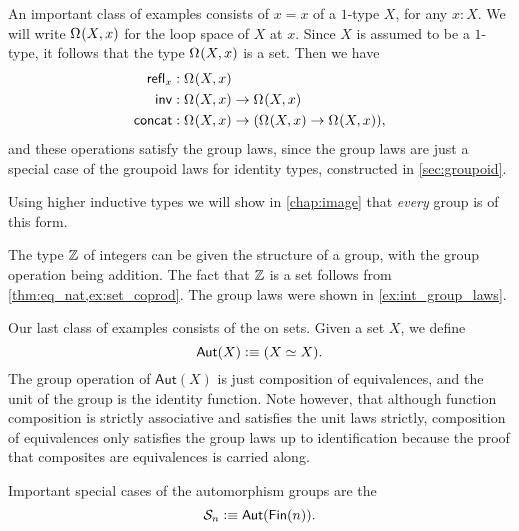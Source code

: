 \begin{eg}
  An important class of examples consists of  $x=x$ of a $1$-type $X$, for any $x:X$. 
  We will write $\Omega^{}(X,x)$ for the loop space of $X$ at $x$. 
  Since $X$ is assumed to be a $1$-type, it follows that the type $\Omega^{}(X,x)$ is a set. Then we have
  \begin{align*}
    \mathsf{refl}_{x} & : \Omega^{}(X,x) \\
    \mathsf{inv} & : \Omega^{}(X,x) \to \Omega^{}(X,x) \\
    \mathsf{concat} & : \Omega^{}(X,x) \to (\Omega^{}(X,x)\to \Omega^{}(X,x)),
  \end{align*}
  and these operations satisfy the group laws, since the group laws are just a special case of the groupoid laws for identity types, constructed in \cref{sec:groupoid}.
  
  Using higher inductive types we will show in \cref{chap:image} that \emph{every} group is of this form.
\end{eg}

\begin{eg}
  The type ${\mathbb{Z}}$ of integers can be given the structure of a group, with the group operation being addition. The fact that ${\mathbb{Z}}$ is a set follows from \cref{thm:eq_nat,ex:set_coprod}. The group laws were shown in \cref{ex:int_group_laws}. 
\end{eg}

\begin{eg}
  Our last class of examples consists of the  on sets. Given a set $X$, we define
  \begin{equation*}
    \mathsf{Aut}(X)\vcentcolon\equiv (X\simeq X).
  \end{equation*}
  The group operation of $\mathsf{Aut}(X)$ is just composition of equivalences, and the unit of the group is the identity function. Note however, that although function composition is strictly associative and satisfies the unit laws strictly, composition of equivalences only satisfies the group laws up to identification because the proof that composites are equivalences is carried along.

  Important special cases of the automorphism groups are the 
  \begin{equation*}
    \mathcal{S}_n\vcentcolon\equiv \mathsf{Aut}(\mathsf{Fin}(n)).
  \end{equation*}
\end{eg}

